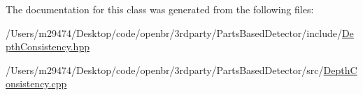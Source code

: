 The documentation for this class was generated from the following files\-:\begin{DoxyCompactItemize}
\item 
/\-Users/m29474/\-Desktop/code/openbr/3rdparty/\-Parts\-Based\-Detector/include/\hyperlink{_depth_consistency_8hpp}{Depth\-Consistency.\-hpp}\item 
/\-Users/m29474/\-Desktop/code/openbr/3rdparty/\-Parts\-Based\-Detector/src/\hyperlink{_depth_consistency_8cpp}{Depth\-Consistency.\-cpp}\end{DoxyCompactItemize}
